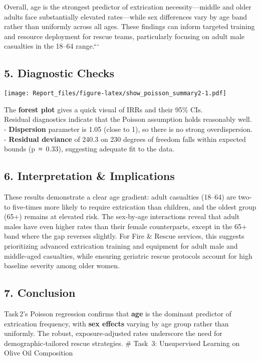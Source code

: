 \documentclass[
]{article}
\begin{document}
Overall, age is the strongest predictor of extrication
necessity---middle and older adults face substantially elevated
rates---while sex differences vary by age band rather than uniformly
across all ages. These findings can inform targeted training and
resource deployment for rescue teams, particularly focusing on adult
male casualties in the 18--64 range.```

\subsection{5. Diagnostic Checks}\label{diagnostic-checks}

\texttt{[image: Report\_files/figure-latex/show\_poisson\_summary2-1.pdf]}

The \textbf{forest plot} gives a quick visual of IRRs and their 95\%
CIs.\\

Residual diagnostics indicate that the Poisson assumption holds
reasonably well.\\
- \textbf{Dispersion} parameter is 1.05 (close to 1), so there is no
strong overdispersion.\\
- \textbf{Residual deviance} of 240.3 on 230 degrees of freedom falls
within expected bounds (p~≈~0.33), suggesting adequate fit to the data.

\subsection{6. Interpretation \&
Implications}\label{interpretation-implications}

These results demonstrate a clear age gradient: adult casualties
(18--64) are two‐ to five‐times more likely to require extrication than
children, and the oldest group (65+) remains at elevated risk. The
sex‐by‐age interactions reveal that adult males have even higher rates
than their female counterparts, except in the 65+ band where the gap
reverses slightly. For Fire \& Rescue services, this suggests
prioritizing advanced extrication training and equipment for adult male
and middle‐aged casualties, while ensuring geriatric rescue protocols
account for high baseline severity among older women.

\subsection{7. Conclusion}\label{conclusion-1}

Task\,2's Poisson regression confirms that \textbf{age} is the dominant
predictor of extrication frequency, with \textbf{sex effects} varying by
age group rather than uniformly. The robust, exposure‐adjusted rates
underscore the need for demographic‐tailored rescue strategies. \#
Task~3: Unsupervised Learning on Olive Oil Composition
\end{document}
